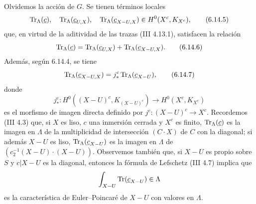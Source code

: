 Olvidemos la acción de $G$. Se tienen términos locales
\begin{equation}
\operatorname{Tr}_{\Lambda}(\underline c),\quad
\operatorname{Tr}_{\Lambda}(\underline c_{U,X}),\quad
\operatorname{Tr}_{\Lambda}(\underline c_{X-U,X})
\in H^0(X^c,K_{X^c}),
\tag{6.14.5}
\end{equation}
que, en virtud de la aditividad de las trazas (III 4.13.1), satisfacen la relación
\begin{equation}
\operatorname{Tr}_{\Lambda}(\underline c)
=
\operatorname{Tr}_{\Lambda}(\underline c_{U,X})
+
\operatorname{Tr}_{\Lambda}(\underline c_{X-U,X}).
\tag{6.14.6}
\end{equation}
Además, según 6.14.4, se tiene
\begin{equation}
\operatorname{Tr}_{\Lambda}(\underline c_{X-U,X})
=
j_*^c\operatorname{Tr}_{\Lambda}(\underline c_{X-U}),
\tag{6.14.7}
\end{equation}
donde
\[
j_*^c:H^0((X-U)^c,K_{(X-U)^c})\longrightarrow H^0(X^c,K_{X^c})
\]
es el morfismo de imagen directa definido por $j^c:(X-U)^c\to X^c$. Recordemos (III 4.3) que, si $X$ es liso, $c$ una inmersión cerrada y $X^c$ es finito, $\operatorname{Tr}_{\Lambda}(\underline c)$ es la imagen en $\Lambda$ de la multiplicidad de intersección $(C\cdot X)$ de $C$ con la diagonal; si además $X-U$ es liso, $\operatorname{Tr}_{\Lambda}(\underline c_{X-U})$ es la imagen en $\Lambda$ de $(c_2^{-1}(X-U)\cdot(X-U))$. Observemos también que, si $X-U$ es propio sobre $S$ y $c|X-U$ es la diagonal, entonces la fórmula de Lefschetz (III 4.7) implica que
\[
\int_{X-U}\operatorname{Tr}(\underline c_{X-U})\in\Lambda
\]
es la característica de Euler--Poincaré de $X-U$ con valores en $\Lambda$.
